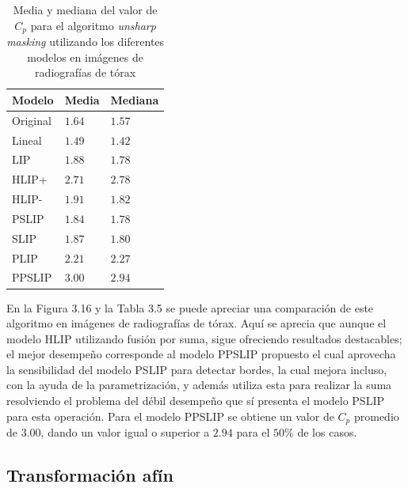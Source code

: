 \begin{table}
	\begin{center}
		\begin{tabular}{|l|l|l|}
			\hline 
			Modelo & Media & Mediana\\
			\hline
			Original & $1.64$ & $1.57$\\
			\hline
			Lineal & $1.49$ & $1.42$\\
			\hline
			LIP & $1.88$ & $1.78$\\
			\hline
			HLIP+ & $2.71$ & $2.78$\\
			\hline
			HLIP- & $1.91$ & $1.82$\\
			\hline
			PSLIP & $1.84$ & $1.78$\\
			\hline
			SLIP & $1.87$ & $1.80$\\
			\hline
			PLIP & $2.21$ & $2.27$\\
			\hline
			PPSLIP & $3.00$ & $2.94$\\
			\hline
		\end{tabular}
		\caption{Media y mediana del valor de $C_p$ para el algoritmo \textit{unsharp masking} utilizando los diferentes modelos en im\'agenes de radiograf\'ias de t\'orax}
	\end{center}
\end{table}

En la Figura 3.16 y la Tabla 3.5 se puede apreciar una comparaci\'on de este algoritmo en im\'agenes de radiograf\'ias de t\'orax. Aqu\'i se aprecia que aunque el modelo HLIP  utilizando fusi\'on por suma, sigue ofreciendo resultados destacables; el mejor desempe\~no corresponde al modelo PPSLIP propuesto el cual aprovecha la sensibilidad del modelo PSLIP para detectar bordes, la cual mejora incluso, con la ayuda de la parametrizaci\'on, y adem\'as utiliza esta para realizar la suma resolviendo el problema del d\'ebil desempe\~no que s\'i presenta el modelo PSLIP para esta operaci\'on. Para el modelo PPSLIP se obtiene un valor de $C_p$ promedio de $3.00$, dando un valor igual o superior a $2.94$ para el $50\%$ de los casos.

\subsection{Transformaci\'on af\'in}

